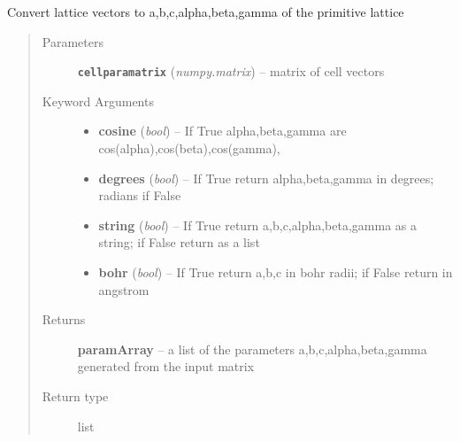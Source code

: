 \documentclass[letterpaper,10pt,english]{sphinxmanual}
\begin{document}

\begin{fulllineitems}
\label{retr:retr.free2abc}
Convert lattice vectors to a,b,c,alpha,beta,gamma of the primitive lattice
\begin{quote}\begin{description}
\item[{Parameters}] \leavevmode
\textbf{\texttt{cellparamatrix}} (\emph{numpy.matrix}) -- matrix of cell vectors

\item[{Keyword Arguments}] \leavevmode\begin{itemize}
\item {} 
\textbf{cosine} (\emph{bool}) --
If True alpha,beta,gamma are cos(alpha),cos(beta),cos(gamma),

\item {} 
\textbf{degrees} (\emph{bool}) --
If True return alpha,beta,gamma in degrees; radians if False

\item {} 
\textbf{string} (\emph{bool}) --
If True return a,b,c,alpha,beta,gamma as a string; if False return as a list

\item {} 
\textbf{bohr} (\emph{bool}) --
If True return a,b,c in bohr radii; if False return in angstrom

\end{itemize}

\item[{Returns}] \leavevmode
\textbf{paramArray} --
a list of the parameters a,b,c,alpha,beta,gamma generated from the input matrix

\item[{Return type}] \leavevmode
list

\end{description}\end{quote}

\end{fulllineitems}

\end{document}
